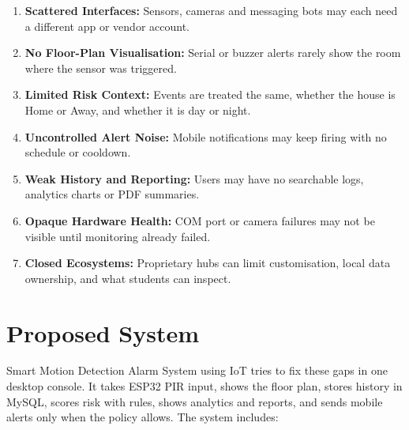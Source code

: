 \documentclass[12pt,a4paper]{report}
\begin{document}
\begin{enumerate}

    \item \textbf{Scattered Interfaces:} Sensors, cameras and messaging bots may each need a different app or vendor account.

    \item \textbf{No Floor-Plan Visualisation:} Serial or buzzer alerts rarely show the room where the sensor was triggered.

    \item \textbf{Limited Risk Context:} Events are treated the same, whether the house is Home or Away, and whether it is day or night.

    \item \textbf{Uncontrolled Alert Noise:} Mobile notifications may keep firing with no schedule or cooldown.

    \item \textbf{Weak History and Reporting:} Users may have no searchable logs, analytics charts or PDF summaries.

    \item \textbf{Opaque Hardware Health:} COM port or camera failures may not be visible until monitoring already failed.

    \item \textbf{Closed Ecosystems:} Proprietary hubs can limit customisation, local data ownership, and what students can inspect.

\end{enumerate}

\section{Proposed System}

Smart Motion Detection Alarm System using IoT tries to fix these gaps in one desktop console. It takes ESP32 PIR input, shows the floor plan, stores history in MySQL, scores risk with rules, shows analytics and reports, and sends mobile alerts only when the policy allows. The system includes:
\end{document}
